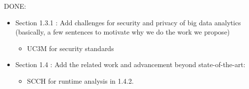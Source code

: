 \documentclass[a4paper,11pt]{article}
\begin{document}
DONE:

\begin{itemize}
\item Section 1.3.1 : Add challenges for security and privacy of big data analytics (basically, a few sentences to motivate why we do the work we propose)
\begin{itemize}
\item UC3M for security standards
\end{itemize}

\item Section 1.4 : Add the related work and advancement beyond state-of-the-art:
\begin{itemize}
\item SCCH for runtime analysis in 1.4.2. 
\end{itemize}
\end{itemize}
\end{document}

